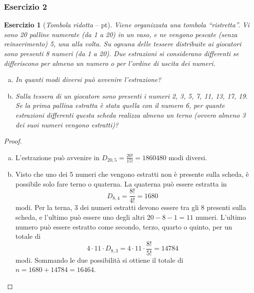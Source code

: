\documentclass{beamer}
\newtheorem{exercise}{Esercizio}
\renewcommand\qedsymbol{$\blacksquare$}
\begin{document}
\begin{frame}[fragile]
	\frametitle{Esercizio 2}

	\begin{exercise}[\textit{Tombola ridotta} -- \pointsQb pt]

		Viene organizzata una tombola ``ristretta''. Vi sono 20 palline numerate (da 1 a 20) in un vaso, e ne vengono pescate (senza reinserimento) 5, una alla volta. Su ognuna delle tessere distribuite ai giocatori sono presenti 8 numeri (da 1 a 20). Due estrazioni si considerano differenti se differiscono per almeno un numero o per l'ordine di uscita dei numeri.

		\begin{enumerate}[(a)]
			\item In quanti modi diversi pu\`o avvenire l'estrazione?
			\item Sulla tessera di un giocatore sono presenti i numeri 2, 3, 5, 7, 11, 13, 17, 19. Se la prima pallina estratta è stata quella con il numero 6, per quante estrazioni differenti questa scheda realizza almeno un terno (ovvero almeno 3 dei suoi numeri vengono estratti)?
		\end{enumerate}
	\end{exercise}
\end{frame}

\begin{frame}[fragile]
	\begin{proof}%

		\begin{enumerate}[(a)]
			\item L'estrazione pu\`o avvenire in $D_{20,5}=\frac{20!}{15!}=1860480$ modi diversi.
			\item Visto che uno dei 5 numeri che vengono estratti non è presente sulla scheda, è possibile solo fare terno o quaterna. La quaterna può essere estratta in $$D_{8,4}=\frac{8!}{4!}=1680$$ modi. Per la terna, 3 dei numeri estratti devono essere tra gli 8 presenti sulla scheda, e l'ultimo può essere uno degli altri $20-8-1=11$ numeri. L'ultimo numero può essere estratto come secondo, terzo, quarto o quinto, per un totale di $$4\cdot11\cdot D_{8,3}=4\cdot11\cdot\frac{8!}{5!}=14784$$ modi. Sommando le due possibilità si ottiene il totale di $n=1680+14784=16464$. \qedhere
		\end{enumerate}
	\end{proof}
\end{frame}
\end{document}
